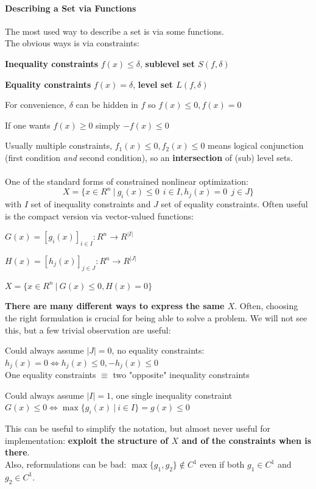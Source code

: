 \documentclass[10pt]{report}
\begin{document}
\paragraph{Describing a Set via Functions} The most used way to describe a set is via some functions.\\
The obvious ways is via constraints:
\begin{list}{}{}
	\item \textbf{Inequality constraints} $f(x)\leq\delta$, \textbf{sublevel set $S(f,\delta)$}
	\item \textbf{Equality constraints} $f(x)=\delta$, \textbf{level set $L(f,\delta)$}
	\item For convenience, $\delta$ can be hidden in $f$ so $f(x)\leq0,f(x)=0$
	\item If one wants $f(x)\geq 0$ simply $-f(x)\leq 0$
\end{list}
Usually multiple constraints, $f_1(x)\leq 0, f_2(x)\leq 0$ means logical conjunction (first condition \textit{and} second condition), so an \textbf{intersection} of (sub) level sets.\\\\
One of the standard forms of constrained nonlinear optimization:
$$X=\{x\in R^n\:|\:g_i(x)\leq 0\:\:i\in I, h_j(x)=0\:\:j\in J\}$$
with $I$ set of inequality constraints and $J$ set of equality constraints. Often useful is the compact version via vector-valued functions:
\begin{list}{}{}
	\item $G(x) = [g_i(x)]_{i\in I} : R^n\rightarrow R^{|I|}$
	\item $H(x) = [h_j(x)]_{j\in J} : R^n\rightarrow R^{|J|}$
	\item $X=\{x\in R^n\:|\:G(x)\leq 0, H(x) = 0\}$
\end{list}
\textbf{There are many different ways to express the same $X$}. Often, choosing the right formulation is crucial for being able to solve a problem. We will not see this, but a few trivial observation are useful:
\begin{list}{}{}
	\item Could always assume $|J|=0$, no equality constraints: $h_j(x) = 0\Leftrightarrow h_j(x)\leq 0, -h_j(x)\leq 0$\\
	One equality constraints $\equiv$ two "opposite" inequality constraints
	\item Could always assume $|I|=1$, one single inequality constraint\\
	$G(x)\leq 0\Leftrightarrow \max\{g_i(x)\:|\:i\in I\} = g(x)\leq 0$
\end{list}
This can be useful to simplify the notation, but almost never useful for implementation: \textbf{exploit the structure of $X$ and of the constraints when is there}.\\
Also, reformulations can be bad: $\max\{g_1,g_2\}\not\in C^1$ even if both $g_1\in C^1$ and $g_2\in C^1$.
\end{document}
